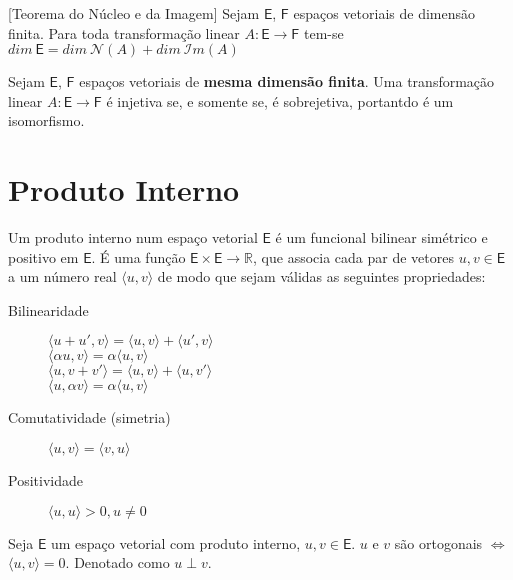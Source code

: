 \documentclass[10pt,a4paper]{article}
\begin{document}
\begin{theorem}[Teorema do Núcleo e da Imagem]
	Sejam $\textsf{E}$, $\textsf{F}$ espaços vetoriais de dimensão finita. Para toda transformação linear $A:\textsf{E} \rightarrow \textsf{F}$ tem-se $dim\ \textsf{E} = dim\ \mathcal{N}(A) + dim\ \mathcal{I}m(A)$
\end{theorem}

\begin{corollary}
	Sejam $\textsf{E}$, $\textsf{F}$ espaços vetoriais de \textbf{mesma dimensão finita}. Uma transformação linear $A:\textsf{E} \rightarrow \textsf{F}$ é injetiva se, e somente se, é sobrejetiva, portantdo é um isomorfismo.
\end{corollary}

\section{Produto Interno}

\begin{definition}
	Um produto interno num espaço vetorial $\textsf{E}$ é um funcional bilinear simétrico e positivo em $\textsf{E}$. É uma função $\textsf{E}\times\textsf{E} \rightarrow \mathbb{R}$, que associa cada par de vetores $u, v \in \textsf{E}$ a um número real $\langle u, v\rangle$ de modo que sejam válidas as seguintes propriedades:
	\begin{description}
		\item [Bilinearidade] 
				\tabto{2cm} $\langle u + u', v\rangle = \langle u, v\rangle + \langle u', v\rangle$ \\
				\tabto{2cm} $\langle \alpha u, v\rangle = \alpha\langle u, v\rangle$ \\
				\tabto{2cm} $\langle u, v + v'\rangle = \langle u, v\rangle + \langle u, v'\rangle$ \\
				\tabto{2cm} $\langle u, \alpha v\rangle = \alpha\langle u, v\rangle$ \\
		\item [Comutatividade (simetria)]
				\tabto{2cm} $\langle u, v\rangle = \langle v, u\rangle$ 
		\item [Positividade]
				\tabto{2cm} $\langle u, u\rangle > 0, u \neq 0$ 
	\end{description}
\end{definition}

\begin{definition}
	Seja $\textsf{E}$ um espaço vetorial com produto interno, $u, v \in \textsf{E}$. $u$ e $v$ são ortogonais $\Leftrightarrow$ $\langle u, v \rangle = 0$. Denotado como $u \perp v$.
\end{definition}
\end{document}
